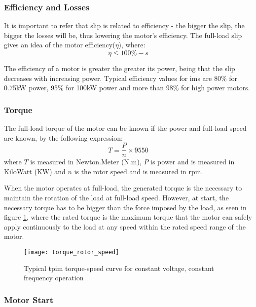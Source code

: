 \subsubsection{Efficiency and Losses}

It is important to refer that slip is related to efficiency - the bigger the slip, the bigger the losses will be, thus lowering the motor's efficiency. The full-load slip gives an idea of the motor efficiency($\eta$), where:
\begin{equation} \label{eq:efficiency_max}
	\eta \leqslant 100\% - s
\end{equation}

The efficiency of a motor is greater the greater its power, being that the slip decreases with increasing power. Typical efficiency values for \acrshort{ims} are 80\% for 0.75kW power, 95\% for 100kW power and more than 98\% for high power motors.

\subsubsection{Torque}

The full-load torque of the motor can be known if the power and full-load speed are known, by the following expression:
\begin{equation} \label{eq:torque}
	T = \frac{P}{n}\times 9550
\end{equation}
where $T$ is measured in Newton.Meter (N.m), $P$ is power and is measured in KiloWatt (KW) and $n$ is the rotor speed and is measured in rpm.

When the motor operates at full-load, the generated torque is the necessary to maintain the rotation of the load at full-load speed. However, at start, the necessary torque has to be bigger than the force imposed by the load, as seen in figure \ref{fig:torque_speed_curve}, where the rated torque is the maximum torque that the motor can safely apply continuously to the load at any speed within the rated speed range of the motor.

\begin{figure}[htbp]
	\centering
	\texttt{[image: torque\_rotor\_speed]}
	\caption{Typical \acrshort{tpim} torque-speed curve for constant voltage, constant frequency operation}
	\label{fig:torque_speed_curve}
\end{figure}

\subsubsection{Motor Start}

